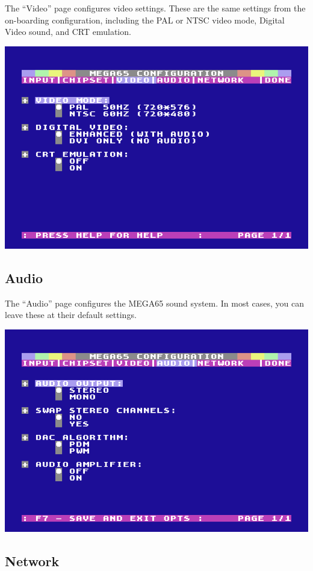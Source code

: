 The ``Video'' page configures video settings. These are the same settings from the on-boarding configuration, including the PAL or NTSC video mode, Digital Video sound, and CRT emulation.

\begin{center}
  \includegraphics[width=0.7\linewidth]{images/ss-m65config-3.png}
\end{center}

\subsection{Audio}

The ``Audio'' page configures the MEGA65 sound system. In most cases, you can leave these at their default settings.

\begin{center}
  \includegraphics[width=0.7\linewidth]{images/ss-m65config-4.png}
\end{center}

\subsection{Network}

